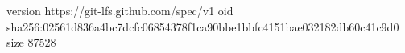 version https://git-lfs.github.com/spec/v1
oid sha256:02561d836a4bc7dcfc06854378f1ca90bbe1bbfc4151bae032182db60c41c9d0
size 87528

